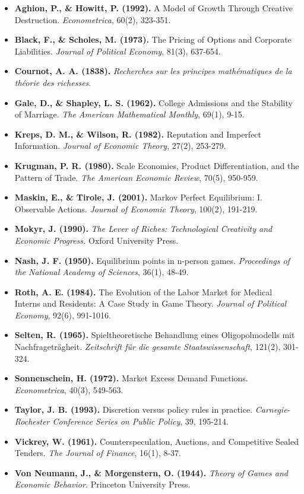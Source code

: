 \documentclass[
]{article}
\providecommand{\tightlist}{%
  \setlength{\itemsep}{0pt}\setlength{\parskip}{0pt}}
\begin{document}
\begin{itemize}
\tightlist
\item
  \textbf{Aghion, P., \& Howitt, P. (1992).} A Model of Growth Through
  Creative Destruction. \emph{Econometrica}, 60(2), 323-351.
\item
  \textbf{Black, F., \& Scholes, M. (1973).} The Pricing of Options and
  Corporate Liabilities. \emph{Journal of Political Economy}, 81(3),
  637-654.
\item
  \textbf{Cournot, A. A. (1838).} \emph{Recherches sur les principes
  mathématiques de la théorie des richesses}.
\item
  \textbf{Gale, D., \& Shapley, L. S. (1962).} College Admissions and
  the Stability of Marriage. \emph{The American Mathematical Monthly},
  69(1), 9-15.
\item
  \textbf{Kreps, D. M., \& Wilson, R. (1982).} Reputation and Imperfect
  Information. \emph{Journal of Economic Theory}, 27(2), 253-279.
\item
  \textbf{Krugman, P. R. (1980).} Scale Economies, Product
  Differentiation, and the Pattern of Trade. \emph{The American Economic
  Review}, 70(5), 950-959.
\item
  \textbf{Maskin, E., \& Tirole, J. (2001).} Markov Perfect Equilibrium:
  I. Observable Actions. \emph{Journal of Economic Theory}, 100(2),
  191-219.
\item
  \textbf{Mokyr, J. (1990).} \emph{The Lever of Riches: Technological
  Creativity and Economic Progress.} Oxford University Press.
\item
  \textbf{Nash, J. F. (1950).} Equilibrium points in n-person games.
  \emph{Proceedings of the National Academy of Sciences}, 36(1), 48-49.
\item
  \textbf{Roth, A. E. (1984).} The Evolution of the Labor Market for
  Medical Interns and Residents: A Case Study in Game Theory.
  \emph{Journal of Political Economy}, 92(6), 991-1016.
\item
  \textbf{Selten, R. (1965).} Spieltheoretische Behandlung eines
  Oligopolmodells mit Nachfrageträgheit. \emph{Zeitschrift für die
  gesamte Staatswissenschaft}, 121(2), 301-324.
\item
  \textbf{Sonnenschein, H. (1972).} Market Excess Demand Functions.
  \emph{Econometrica}, 40(3), 549-563.
\item
  \textbf{Taylor, J. B. (1993).} Discretion versus policy rules in
  practice. \emph{Carnegie-Rochester Conference Series on Public
  Policy}, 39, 195-214.
\item
  \textbf{Vickrey, W. (1961).} Counterspeculation, Auctions, and
  Competitive Sealed Tenders. \emph{The Journal of Finance}, 16(1),
  8-37.
\item
  \textbf{Von Neumann, J., \& Morgenstern, O. (1944).} \emph{Theory of
  Games and Economic Behavior.} Princeton University Press.
\end{itemize}
\end{document}
